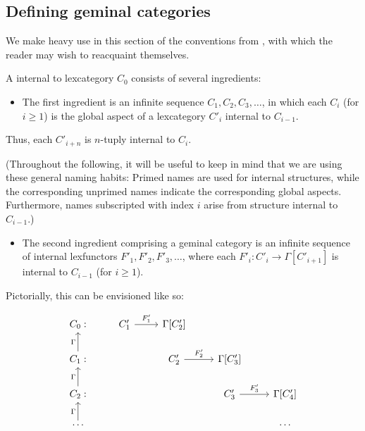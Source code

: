 \subsection{Defining geminal categories}
We make heavy use in this section of the conventions from , with which the reader may wish to reacquaint themselves.

\begin{definition}\label{VerboseGeminalCatDefn}
A  internal to lexcategory $C_0$ consists of several ingredients:

\begin{itemize}
    \item 
    The first ingredient is an infinite sequence $C_1, C_2, C_3, \ldots$, in which each $C_i$ (for $i \geq 1$) is the global aspect of a lexcategory $C'_i$ internal to $C_{i - 1}$.
\end{itemize}

Thus, each $C'_{i + n}$ is $n$-tuply internal to $C_i$.

(Throughout the following, it will be useful to keep in mind that we are using these general naming habits: Primed names are used for internal structures, while the corresponding unprimed names indicate the corresponding global aspects. Furthermore, names subscripted with index $i$ arise from structure internal to $C_{i - 1}$.)

\begin{itemize}
    \item
    The second ingredient comprising a geminal category is an infinite sequence of internal lexfunctors $F'_1, F'_2, F'_3, \ldots$, where each $F'_i : C'_i \to \Gamma[C'_{i + 1}]$ is internal to $C_{i - 1}$ (for $i \geq 1$).
\end{itemize}

Pictorially, this can be envisioned like so: 

\[\begin{tikzcd}
	{C_0:} & {C'_1} & {\Gamma[C'_2]} \\
	{C_1:} && {C'_2} & {\Gamma[C'_3]} \\
	{C_2:} &&& {C'_3} & {\Gamma[C'_4]} \\
	\ldots &&&& \ldots
	\arrow["{F'_1}", from=1-2, to=1-3]
	\arrow["{F'_2}", from=2-3, to=2-4]
	\arrow["{F'_3}", from=3-4, to=3-5]
	\arrow["\Gamma", from=2-1, to=1-1]
	\arrow["\Gamma", from=3-1, to=2-1]
	\arrow["\Gamma", from=4-1, to=3-1]
\end{tikzcd}\]


\end{definition}
